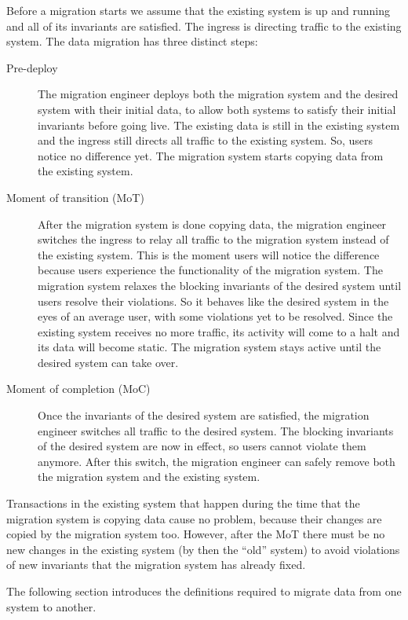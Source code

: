 \documentclass[runningheads]{llncs}
\begin{document}
   Before a migration starts we assume that the existing system is up and running and all of its invariants are satisfied.
   The ingress is directing traffic to the existing system.
   The data migration has three distinct steps:
\begin{description}
\item[Pre-deploy]
      The migration engineer deploys both the migration system and the desired system with their initial data,
      to allow both systems to satisfy their initial invariants before going live.
      The existing data is still in the existing system and the ingress still directs all traffic to the existing system.
      So, users notice no difference yet.
      The migration system starts copying data from the existing system.
\item[Moment of transition (MoT)]
      After the migration system is done copying data, the migration engineer switches the ingress to relay all traffic to the migration system instead of the existing system.
      This is the moment users will notice the difference because users experience the functionality of the migration system.
      The migration system relaxes the blocking invariants of the desired system until users resolve their violations.
      So it behaves like the desired system in the eyes of an average user, with some violations yet to be resolved.
      Since the existing system receives no more traffic, its activity will come to a halt and its data will become static.
      The migration system stays active until the desired system can take over.
\item[Moment of completion (MoC)]
      Once the invariants of the desired system are satisfied, the migration engineer switches all traffic to the desired system.
      The blocking invariants of the desired system are now in effect, so users cannot violate them anymore.
      After this switch, the migration engineer can safely remove both the migration system and the existing system.
\end{description}

   Transactions in the existing system that happen during the time that the migration system is copying data cause no problem,
   because their changes are copied by the migration system too.
   However, after the MoT there must be no new changes in the existing system (by then the ``old'' system)
   to avoid violations of new invariants that the migration system has already fixed.

   The following section introduces the definitions required to migrate data from one system to another.
\end{document}
